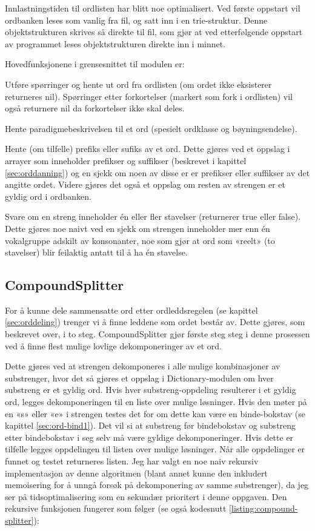 Innlastningstiden til ordlisten har blitt noe optimalisert. Ved første oppstart vil ordbanken leses som vanlig fra fil, og satt inn i en trie-struktur. Denne objektstrukturen skrives så direkte til fil, som gjør at ved etterfølgende oppstart av programmet leses objektstrukturen direkte inn i minnet.

Hovedfunksjonene i grensesnittet til modulen er: 
\begin{items}
\item Utføre spørringer og hente ut ord fra ordlisten (om ordet ikke eksisterer returneres nil). Spørringer etter forkortelser (markert som fork i ordlisten) vil også returnere nil da forkortelser ikke skal deles. 
\item Hente paradigmebeskrivelsen til et ord (spesielt ordklasse og bøyningsendelse). 
\item Hente (om tilfelle) prefiks eller sufiks av et ord. Dette gjøres ved et oppslag i arrayer som inneholder prefikser og suffikser (beskrevet i kapittel \ref{sec:orddanning}) og en sjekk om noen av disse er er prefikser eller suffikser av det angitte ordet. Videre gjøres det også et oppslag om resten av strengen er et gyldig ord i ordbanken. 
\item Svare om en streng inneholder én eller fler stavelser (returnerer true eller false). Dette gjøres noe naivt ved en sjekk om strengen inneholder mer enn én vokalgruppe adskilt av konsonanter, noe som gjør at ord som «reelt» (to stavelser) blir feilaktig antatt til å ha én stavelse.
\end{items}

\subsection{CompoundSplitter}

For å kunne dele sammensatte ord etter ordleddsregelen (se kapittel \ref{sec:orddeling}) trenger vi å finne leddene som ordet består av. Dette gjøres, som beskrevet over, i to steg. CompoundSplitter gjør første steg steg i denne prosessen ved å finne flest mulige lovlige dekomponeringer av et ord.

Dette gjøres ved at strengen dekomponeres i alle mulige kombinasjoner av substrenger, hvor det så gjøres et oppslag i Dictionary-modulen om hver substreng er et gyldig ord. Hvis hver substreng-oppdeling resulterer i et gyldig ord, legges dekomponeringen til en liste over mulige løsninger. Hvis den møter på en «s» eller «e» i strengen testes det for om dette kan være en binde-bokstav (se kapittel \ref{sec:ord-bind1}). Det vil si at substreng før bindebokstav og substreng etter bindebokstav i seg selv må være gyldige dekomponeringer. Hvis dette er tilfelle legges oppdelingen til listen over mulige løsninger. Når alle oppdelinger er funnet og testet returneres listen. Jeg har valgt en noe naiv rekursiv implementasjon av denne algoritmen (blant annet kunne den inkludert memoisering for å unngå forsøk på dekomponering av samme substrenger), da jeg ser på tidsoptimalisering som en sekundær prioritert i denne oppgaven. Den rekursive funksjonen fungerer som følger (se også kodesnutt \ref{listing:compound-splitter}):

